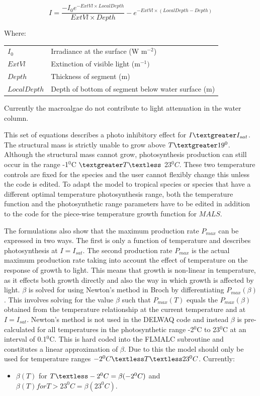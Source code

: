 \documentclass{deltares_manual}
\begin{document}
\begin{equation}
I = \frac{-I_{0}e^{-ExtVl \times LocalDepth}}{ExtVl \times Depth}  - e^{-ExtVl \times (LocalDepth - Depth)}
\end{equation}

Where:\\
\begin{tabular}{ll}
$I_{0}$ & Irradiance at the surface (W m$^{-2}$)\\
$ExtVl$ & Extinction of visible light (m$^{-1})$\\
$Depth$ & Thickness of segment (m)\\
$LocalDepth$ & Depth of bottom of segment below water surface (m)\\
\end{tabular}

Currently the macroalgae do not contribute to light attenuation in the water column.

This set of equations describes a photo inhibitory effect for $I\textgreater I_{sat}$. The structural mass is strictly unable to grow above $T \textgreater 19^{0}$. Although the structural mass cannot grow, photosynthesis production can still occur in the range -1$^{0}$C $\textgreater T \textless$ 23$^{0}C$. These two temperature controls are fixed for the species and the user cannot flexibly change this unless the code is edited. To adapt the model to tropical species or species that have a different optimal temperature photosynthesis range, both the temperature function and the photosynthetic range parameters have to be edited in addition to the code for the piece-wise temperature growth function for $MALS$.

The formulations also show that the maximum production rate $P_{max}$ can be expressed in two ways. The first is only a function of temperature and describes photosynthesis at $I = I_{sat}$. The second production rate $P_{max}$ is the actual maximum production rate taking into account the effect of temperature on the response of growth to light. This means that growth is non-linear in temperature, as it effects both growth directly and also the way in which growth is affected by light. $\beta$ is solved for using Newton's method in Broch by differentiating $P_{max}(\beta)$. This involves solving for the value $\beta$ such that $P_{max}(T)$ equals the $P_{max}(\beta)$ obtained from the temperature relationship at the current temperature and at $I = I_{sat}$. Newton's method is not used in the DELWAQ code and instead $\beta$ is pre-calculated for all temperatures in the photosynthetic range -2$^{0}$C to 23$^{0}$C at an interval of 0.1$^{0}$C. This is hard coded into the FLMALC subroutine and constitutes a linear approximation of $\beta$. Due to this the model should only be used for temperature ranges $-2^{0}C \textless T \textless 23^{0}C$. Currently:
\begin{itemize}
	\item $\beta(T)$ for $T \textless -2^{0}C = \beta(-2^{0}C)$ and $\beta(T) for T > 23^{0}C = \beta(23^{0}C)$. 
\end{itemize} 
\end{document}
